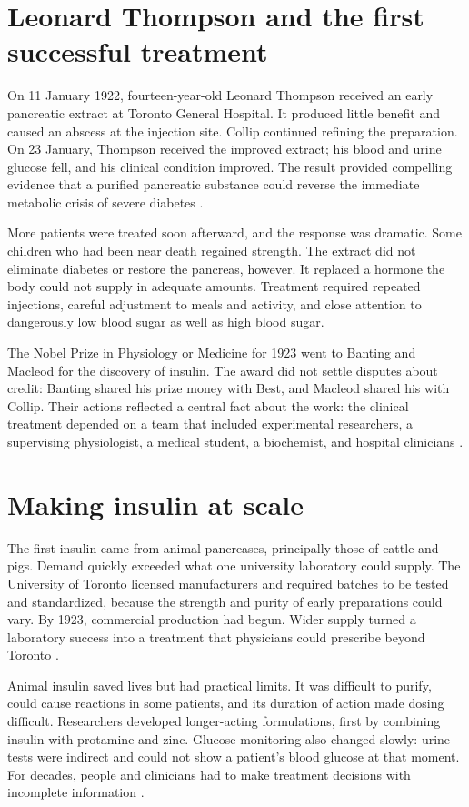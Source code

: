 \documentclass[12pt,oneside]{book}
\begin{document}
\section{Leonard Thompson and the first successful treatment}
On 11 January 1922, fourteen-year-old Leonard Thompson received an early
pancreatic extract at Toronto General Hospital. It produced little benefit and
caused an abscess at the injection site. Collip continued refining the
preparation. On 23 January, Thompson received the improved extract; his blood
and urine glucose fell, and his clinical condition improved. The result
provided compelling evidence that a purified pancreatic substance could
reverse the immediate metabolic crisis of severe diabetes
\cite{fralickinsulin,niddkinsulin}.

More patients were treated soon afterward, and the response was dramatic. Some
children who had been near death regained strength. The extract did not
eliminate diabetes or restore the pancreas, however. It replaced a hormone the
body could not supply in adequate amounts. Treatment required repeated
injections, careful adjustment to meals and activity, and close attention to
dangerously low blood sugar as well as high blood sugar.

The Nobel Prize in Physiology or Medicine for 1923 went to Banting and Macleod
for the discovery of insulin. The award did not settle disputes about credit:
Banting shared his prize money with Best, and Macleod shared his with Collip.
Their actions reflected a central fact about the work: the clinical treatment
depended on a team that included experimental researchers, a supervising
physiologist, a medical student, a biochemist, and hospital clinicians
\cite{nobelinsulin,macleodinsulin}.

\section{Making insulin at scale}
The first insulin came from animal pancreases, principally those of cattle and
pigs. Demand quickly exceeded what one university laboratory could supply.
The University of Toronto licensed manufacturers and required batches to be
tested and standardized, because the strength and purity of early preparations
could vary. By 1923, commercial production had begun. Wider supply turned a
laboratory success into a treatment that physicians could prescribe beyond
Toronto \cite{fdaInsulinHistory,niddkinsulin}.

Animal insulin saved lives but had practical limits. It was difficult to
purify, could cause reactions in some patients, and its duration of action
made dosing difficult. Researchers developed longer-acting formulations, first
by combining insulin with protamine and zinc. Glucose monitoring also changed
slowly: urine tests were indirect and could not show a patient's blood glucose
at that moment. For decades, people and clinicians had to make treatment
decisions with incomplete information \cite{niddkinsulin,fdaInsulinHistory}.
\end{document}
